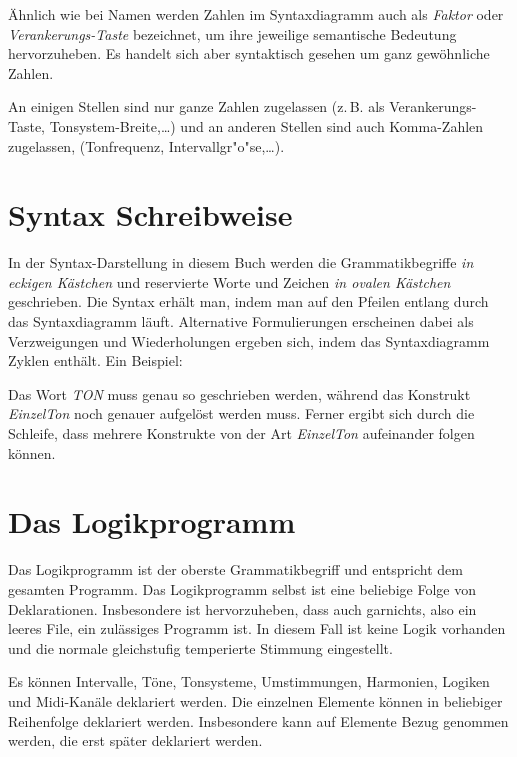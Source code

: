 Ähnlich wie bei Namen werden Zahlen im Syntaxdiagramm auch als \emph{Faktor}
oder \emph{Verankerungs-Taste} bezeichnet,
um ihre jeweilige semantische Bedeutung
hervorzuheben. Es handelt sich aber syntaktisch gesehen um ganz gewöhnliche
Zahlen.

An einigen Stellen sind nur ganze Zahlen zugelassen (z.\,B. als
Verankerungs-Taste, Tonsystem-Breite,\ldots) und an anderen Stellen
sind auch Komma-Zahlen zugelassen, (Tonfrequenz,
In\-ter\-vall\-gr"o"se,\ldots).



\chapter{Syntax Schreibweise}\label{cha:syntax-schreibweise}
\label{drei}

In der Syntax-Darstellung in diesem Buch werden die Grammatikbegriffe
\emph{in eckigen Kästchen} und reservierte Worte und Zeichen \emph{in
ovalen Kästchen} geschrieben. Die Syntax erhält man, indem man auf den
Pfeilen entlang durch das Syntaxdiagramm läuft.
Alternative Formulierungen erscheinen dabei als Verzweigungen
und Wiederholungen ergeben sich, indem das Syntaxdiagramm Zyklen enthält.
Ein Beispiel:



Das Wort \emph{TON} muss genau so geschrieben werden, während das Konstrukt
\emph{EinzelTon} noch genauer aufgelöst werden muss. Ferner ergibt sich durch
die Schleife, dass mehrere Konstrukte von der Art \emph{EinzelTon}
aufeinander folgen können.


\chapter{Das Logikprogramm}\label{cha:das-logikprogramm}
Das Logikprogramm ist der oberste Grammatikbegriff und entspricht
dem gesamten Programm. Das Logikprogramm selbst ist eine beliebige
Folge von Deklarationen.
Insbesondere ist hervorzuheben, dass auch
garnichts, also ein leeres File, ein zulässiges Programm ist.
In diesem Fall ist keine Logik vorhanden und die normale
gleichstufig temperierte Stimmung eingestellt.

Es können Intervalle, Töne, Tonsysteme, Umstimmungen, Harmonien,
Logiken und Midi-Kanäle deklariert werden. Die einzelnen Elemente können
in beliebiger Reihenfolge deklariert werden. Insbesondere kann auf
Elemente Bezug genommen werden, die erst später deklariert werden.

